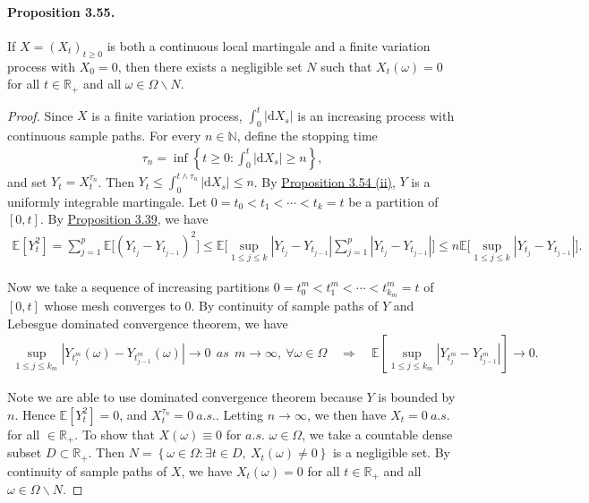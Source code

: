 \documentclass{article}
\numberwithin{equation}{section}
\newcommand{\E}{\mathbb{E}}
\renewcommand{\d}{\mathrm{d}}
\theoremstyle{plain}
\theoremstyle{definition}
\begin{document}
\paragraph{Proposition 3.55.\label{prop:3.55}} If $X=(X_t)_{t\geq 0}$ is both a continuous local martingale and a finite variation process with $X_0=0$, then there exists a negligible set $N$ such that $X_t(\omega)=0$ for all $t\in\mathbb{R}_+$ and all $\omega\in\Omega\backslash N$.
\begin{proof}
Since $X$ is a finite variation process, $\int_0^t\vert\d X_s\vert$ is an increasing process with continuous sample paths. For every $n\in\mathbb{N}$, define the stopping time 
\begin{align*}
	\tau_n=\inf\left\{t\geq 0:\int_0^t\vert\d X_s\vert\geq n\right\},
\end{align*}
and set $Y_t = X_t^{\tau_n}$. Then $Y_t\leq\int_0^{t\wedge\tau_n}\vert\d X_s\vert\leq n$. By \hyperref[prop:3.54]{Proposition 3.54 (ii)}, $Y$ is a uniformly integrable martingale. Let $0=t_0<t_1<\cdots<t_k=t$ be a partition of $[0,t]$. By \hyperref[prop:3.39]{Proposition 3.39}, we have
\begin{align*}
	\E\left[Y_t^2\right] = \sum_{j=1}^p\E\biggl[\left(Y_{t_j}-Y_{t_{j-1}}\right)^2\biggr]\leq\E\biggl[\sup_{1\leq j\leq k}\left\vert Y_{t_j}-Y_{t_{j-1}}\right\vert\sum_{j=1}^p\left\vert Y_{t_j}-Y_{t_{j-1}}\right\vert\biggr]\leq n\E\biggl[\sup_{1\leq j\leq k}\left\vert Y_{t_j}-Y_{t_{j-1}}\right\vert\biggr].
\end{align*}

Now we take a sequence of increasing partitions $0=t_0^m<t_1^m<\cdots<t_{k_m}^m=t$ of $[0,t]$ whose mesh converges to $0$. By continuity of sample paths of $Y$ and Lebesgue dominated convergence theorem, we have
\begin{align*}
\sup_{1\leq j\leq k_m}\left\vert Y_{t_j^m}(\omega)-Y_{t_{j-1}^m}(\omega)\right\vert \to 0\ \ \textit{as}\ \ m\to\infty,\ \forall \omega\in\Omega\quad\Rightarrow\quad \E\left[\sup_{1\leq j\leq k_m}\left\vert Y_{t_j^m}-Y_{t_{j-1}^m}\right\vert\right]\to 0.
\end{align*}

Note we are able to use dominated convergence theorem because $Y$ is bounded by $n$. Hence $\E[Y_t^2]=0$, and $X_t^{\tau_n}=0\ a.s.$. Letting $n\to\infty$, we then have $X_t=0\ a.s.$ for all $\in\mathbb{R}_+$. To show that $X(\omega)\equiv 0$ for $a.s.$ $\omega\in\Omega$, we take a countable dense subset $D\subset\mathbb{R}_+$. Then $N=\left\{\omega\in\Omega: \exists t\in D,\ X_t(\omega)\neq 0\right\}$ is a negligible set. By continuity of sample paths of $X$, we have $X_t(\omega)=0$ for all $t\in\mathbb{R}_+$ and all $\omega\in\Omega\backslash N$.
\end{proof}
\end{document}
